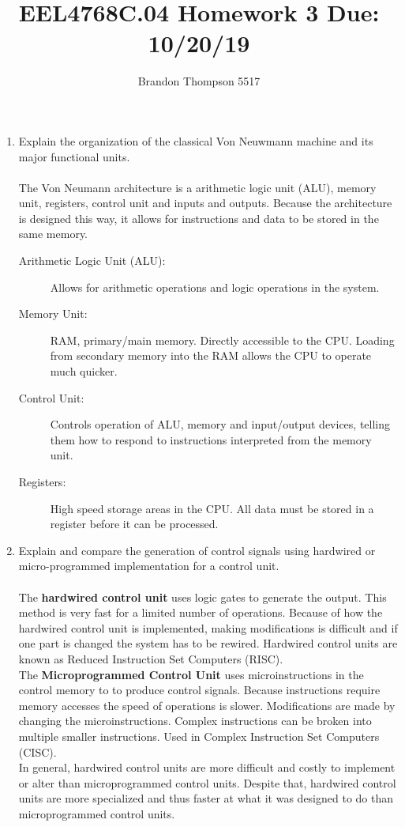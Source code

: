 \documentclass[a4paper]{article}
\begin{document}
	\title{EEL4768C.04 Homework 3 Due: 10/20/19}
	\author{Brandon Thompson 5517}
	\maketitle

	\begin{enumerate}
		\item Explain the organization of the classical Von Neuwmann machine and its
			major functional units.\\
			\\
			The Von Neumann architecture is a arithmetic logic unit (ALU), memory unit, 
			registers, control unit and inputs and outputs. Because the architecture is designed this 
			way, it allows for instructions and data to be stored in the same memory.
			\begin{description}
				\item[Arithmetic Logic Unit (ALU):] Allows for arithmetic operations and
					logic operations in the system.
				\item[Memory Unit:] RAM, primary/main memory. Directly accessible to the
					CPU. Loading from secondary memory into the RAM allows the CPU to
					operate much quicker.
				\item[Control Unit:] Controls operation of ALU, memory and input/output
					devices, telling them how to respond to instructions interpreted from
					the memory unit.
				\item[Registers:] High speed storage areas in the CPU. All data must be stored
					in a register before it can be processed.
			\end{description}
		\item Explain and compare the generation of control signals using hardwired
			or micro-programmed implementation for a control unit.\\
			\\
			The \textbf{hardwired control unit} uses logic gates to generate the output. This method is
			very fast for a limited number of operations. Because of how the hardwired control
			unit is implemented, making modifications is difficult and if one part is changed
			the system has to be rewired. Hardwired control units are known as Reduced Instruction
			Set Computers (RISC).\\
			The \textbf{Microprogrammed Control Unit} uses microinstructions in the control memory to
			to produce control signals. Because instructions require memory accesses the speed
			of operations is slower. Modifications are made by changing the microinstructions.
			Complex instructions can be broken into multiple smaller instructions. Used in
			Complex Instruction Set Computers (CISC).\\
			In general, hardwired control units are more difficult and costly to implement or
			alter than microprogrammed control units. Despite that, hardwired control units
			are more specialized and thus faster at what it was designed to do than microprogrammed
			control units.
	\end{enumerate}
\end{document}
